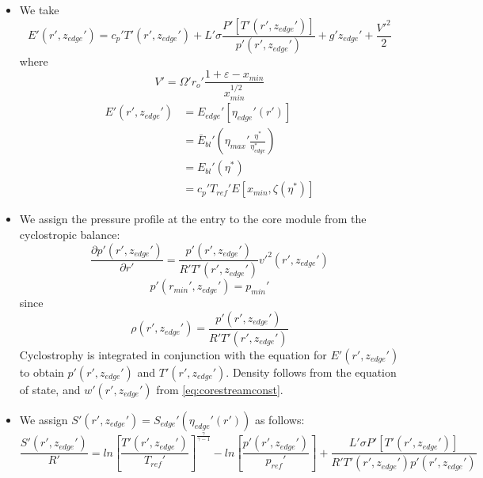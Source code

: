 \documentclass[preprint, prX]{revtex4}
\newcommand{\sbfrac}[2]{\left[\frac{#1}{#2}\right]}
\newcommand{\pd}[2]{\frac{\partial#1}{\partial#2}}
\newcommand{\gogmo}{\frac{\gamma}{\gamma-1}}
\newcommand{\rmin}{r_{min}}
\newcommand{\xmin}{x_{min}}
\newcommand{\zedge}{z_{edge}}
\begin{document}
\begin{itemize}
\item
We take
\begin{equation}
E'(r',\zedge') = c_p' T'(r',\zedge') + L'\sigma \frac{P'[T'(r',\zedge')]}{p'(r',\zedge')} + g'\zedge' + \frac{V'^2}{2}
\end{equation}
where
\begin{equation}
V' = \Omega'r_o' \frac{1 + \varepsilon - \xmin}{\xmin^{1/2}}
\end{equation}
\begin{equation}
\begin{split}
E'(r',\zedge') &= E_{edge}'[\eta_{edge}'(r')] \\
&= \bar{E}_{bl}'\left( \eta_{max}' \frac{\eta^*}{\eta_{edge}^*}\right) \\
&= E_{bl}'(\eta^*) \\
&= c_p'T_{ref}' E[\xmin, \zeta(\eta^*)]
\end{split}
\end{equation}
\item
We assign the pressure profile at the entry to the core module from the cyclostropic balance:
\begin{equation}
\pd{p'(r',\zedge')}{r'} = \frac{p'(r',\zedge')}{R'T'(r',\zedge')}v'^2(r',\zedge')
\end{equation}
\begin{equation}
p'(\rmin', \zedge') = p_{min}'
\end{equation}
since
\begin{equation}
\rho(r',\zedge') = \frac{p'(r',\zedge')}{R'T'(r',\zedge')}
\end{equation}
Cyclostrophy is integrated in conjunction with the equation for $E'(r',\zedge')$ to obtain $p'(r',\zedge')$ and $T'(r',\zedge')$. Density follows from the equation of state, and $w'(r',\zedge')$ from \eqref{eq:corestreamconst}.
\item
We assign $S'(r',\zedge') = S_{edge}'(\eta_{edge}'(r'))$ as follows:
\begin{equation}
\frac{S'(r',\zedge')}{R'} = ln \sbfrac{T'(r',\zedge')}{T_{ref}'}^\gogmo - ln \sbfrac{p'(r',\zedge')}{p_{ref}'} + \frac{L'\sigma P'[T'(r',\zedge')]}{R'T'(r',\zedge')p'(r',\zedge')}
\end{equation}
\end{itemize}
\end{document}
